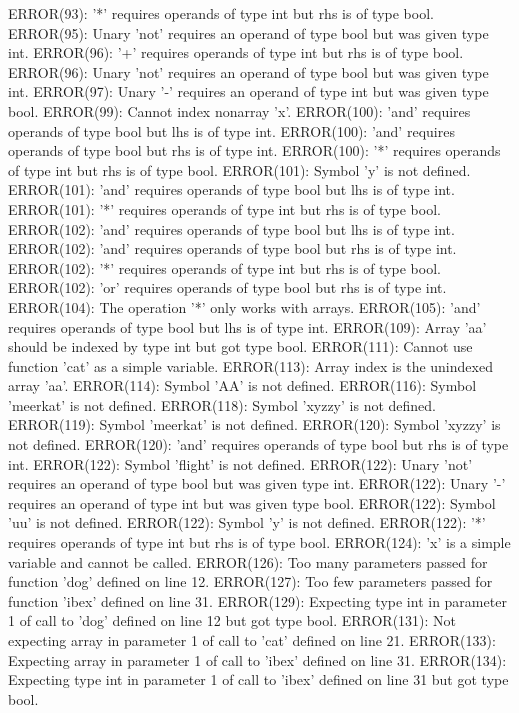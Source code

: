 \documentclass[12pt]{book}
\begin{document}
ERROR(93): '*' requires operands of type int but rhs is of type bool.
ERROR(95): Unary 'not' requires an operand of type bool but was given type int.
ERROR(96): '+' requires operands of type int but rhs is of type bool.
ERROR(96): Unary 'not' requires an operand of type bool but was given type int.
ERROR(97): Unary '-' requires an operand of type int but was given type bool.
ERROR(99): Cannot index nonarray 'x'.
ERROR(100): 'and' requires operands of type bool but lhs is of type int.
ERROR(100): 'and' requires operands of type bool but rhs is of type int.
ERROR(100): '*' requires operands of type int but rhs is of type bool.
ERROR(101): Symbol 'y' is not defined.
ERROR(101): 'and' requires operands of type bool but lhs is of type int.
ERROR(101): '*' requires operands of type int but rhs is of type bool.
ERROR(102): 'and' requires operands of type bool but lhs is of type int.
ERROR(102): 'and' requires operands of type bool but rhs is of type int.
ERROR(102): '*' requires operands of type int but rhs is of type bool.
ERROR(102): 'or' requires operands of type bool but rhs is of type int.
ERROR(104): The operation '*' only works with arrays.
ERROR(105): 'and' requires operands of type bool but lhs is of type int.
ERROR(109): Array 'aa' should be indexed by type int but got type bool.
ERROR(111): Cannot use function 'cat' as a simple variable.
ERROR(113): Array index is the unindexed array 'aa'.
ERROR(114): Symbol 'AA' is not defined.
ERROR(116): Symbol 'meerkat' is not defined.
ERROR(118): Symbol 'xyzzy' is not defined.
ERROR(119): Symbol 'meerkat' is not defined.
ERROR(120): Symbol 'xyzzy' is not defined.
ERROR(120): 'and' requires operands of type bool but rhs is of type int.
ERROR(122): Symbol 'flight' is not defined.
ERROR(122): Unary 'not' requires an operand of type bool but was given type int.
ERROR(122): Unary '-' requires an operand of type int but was given type bool.
ERROR(122): Symbol 'uu' is not defined.
ERROR(122): Symbol 'y' is not defined.
ERROR(122): '*' requires operands of type int but rhs is of type bool.
ERROR(124): 'x' is a simple variable and cannot be called.
ERROR(126): Too many parameters passed for function 'dog' defined on line 12.
ERROR(127): Too few parameters passed for function 'ibex' defined on line 31.
ERROR(129): Expecting type int in parameter 1 of call to 'dog' defined on line 12 but got type bool.
ERROR(131): Not expecting array in parameter 1 of call to 'cat' defined on line 21.
ERROR(133): Expecting array in parameter 1 of call to 'ibex' defined on line 31.
ERROR(134): Expecting type int in parameter 1 of call to 'ibex' defined on line 31 but got type bool.
\end{document}
